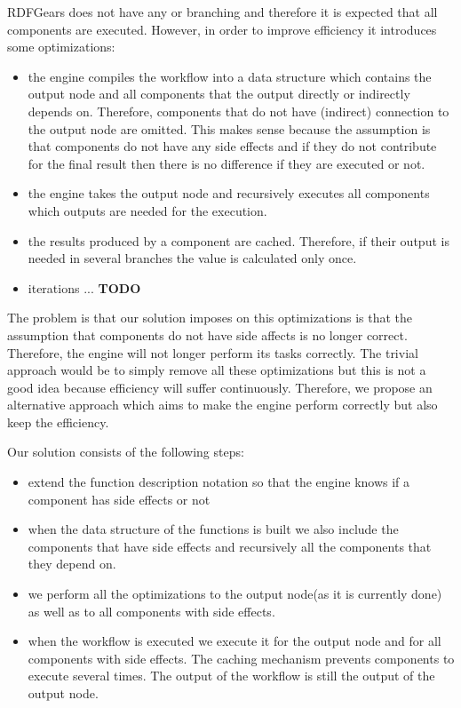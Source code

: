 RDFGears does not have any or branching and therefore it is expected that all components are executed. However, in order to improve efficiency it introduces some optimizations:
\begin{itemize}
	\item the engine compiles the workflow into a data structure which contains the output node and all components that the output directly or indirectly depends on. Therefore, components that do not have (indirect) connection to the output node are omitted. This makes sense because the assumption is that components do not have any side effects and if they do not contribute for the final result then there is no difference if they are executed or not.
	
	\item the engine takes the output node and recursively executes all components which outputs are needed for the execution.
	  
	\item the results produced by a component are cached. Therefore, if their output is needed in several branches the value is calculated only once.
	
	\item iterations ...  \textbf{TODO}
\end{itemize}

The problem is that our solution imposes on this optimizations is that the assumption that components do not have side affects is no longer correct. Therefore, the engine will not longer perform its tasks correctly. The trivial approach would be to simply remove all these optimizations but this is not a good idea because efficiency will suffer continuously. Therefore, we propose an alternative approach which aims to make the engine perform correctly but also keep the efficiency.

Our solution consists of the following steps:
\begin{itemize}
	\item extend the function description notation so that the engine knows if a component has side effects or not
	\item when the data structure of the functions is built we also include the components that have side effects and recursively all the components that they depend on.
	\item we perform all the optimizations to the output node(as it is currently done) as well as to all components with side effects. 
	\item when the workflow is executed we execute it for the output node and for all components with side effects. The caching mechanism prevents components to execute several times. The output of the workflow is still the output of the output node.
\end{itemize}


